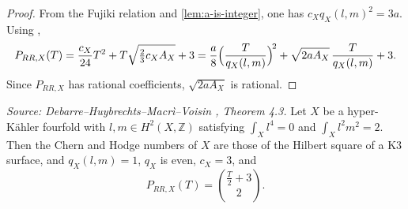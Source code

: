 \begin{proof}
  From the Fujiki relation and \cref{lem:a-is-integer}, one has \(c_X q_X(l,m)^2 = 3a\).
  Using \cite[Lemma~5.7]{jia},
  \[
    P_{RR,X}(T)
    = \frac{c_X}{24}T^2 + T\sqrt{\tfrac{2}{3}c_X A_X} + 3
    = \frac{a}{8}\Bigl(\frac{T}{q_X(l,m)}\Bigr)^{\!2}
      + \sqrt{2aA_X}\,\frac{T}{q_X(l,m)} + 3.
  \]
  Since \(P_{RR,X}\) has rational coefficients, \(\sqrt{2aA_X}\) is rational.
\end{proof}

\begin{theorem}
  \label{thm:conjecture14-fourfold}
  \textit{Source: Debarre--Huybrechts--Macr\`i--Voisin \cite{MR4654610}, Theorem 4.3.}
  Let \(X\) be a hyper-K\"ahler fourfold with \(l, m \in H^2(X, \mathbb{Z})\) satisfying
  \(\int_X l^4 = 0\) and \(\int_X l^2 m^2 = 2\).  Then the Chern and Hodge numbers of
  \(X\) are those of the Hilbert square of a K3 surface, and \(q_X(l,m) = 1\), \(q_X\) is
  even, \(c_X = 3\), and
  \[
    P_{RR,X}(T) = \binom{\tfrac{T}{2} + 3}{2}.
  \]
\end{theorem}

